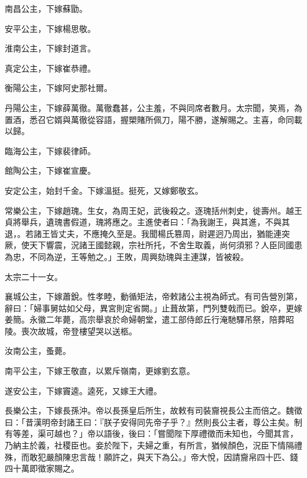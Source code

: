 \begin{pinyinscope}
 南昌公主，下嫁蘇勖。



 安平公主，下嫁楊思敬。



 淮南公主，下嫁封道言。



 真定公主，下嫁崔恭禮。



 衡陽公主，下嫁阿史那社爾。



 丹陽公主，下嫁薛萬徹。萬徹蠢甚，公主羞，不與同席者數月。太宗聞，笑焉，為置酒，悉召它婿與萬徹從容語，握槊賭所佩刀，陽不勝，遂解賜之。主喜，命同載以歸。



 臨海公主，下嫁裴律師。



 館陶公主，下嫁崔宣慶。



 安定公主，始封千金。下嫁溫挺。挺死，又嫁鄭敬玄。



 常樂公主，下嫁趙瑰。生女，為周王妃，武後殺之。逐瑰括州刺史，徙壽州。越王貞將舉兵，遺瑰書假道，瑰將應之。主進使者曰：「為我謝王，與其進，不與其退，。若諸王皆丈夫，不應掩久至是。我聞楊氏篡周，尉遲迥乃周出，猶能連突厥，使天下響震，況諸王國懿親，宗社所托，不舍生取義，尚何須邪？人臣同國患為忠，不同為逆，王等勉之。」王敗，周興劾瑰與主連謀，皆被殺。



 太宗二十一女。



 襄城公主，下嫁蕭銳。性孝睦，動循矩法，帝敕諸公主視為師式。有司告營別第，辭曰：「婦事舅姑如父母，異宮則定省闕。」止葺故第，門列雙戟而已。銳卒，更嫁姜簡。永徽二年薨，高宗舉哀於命婦朝堂，遣工部侍郎丘行淹馳驛吊祭，陪葬昭陵。喪次故城，帝登樓望哭以送柩。



 汝南公主，蚤薨。



 南平公主，下嫁王敬直，以累斥嶺南，更嫁劉玄意。



 遂安公主，下嫁竇逵。逵死，又嫁王大禮。



 長樂公主，下嫁長孫沖。帝以長孫皇后所生，故敕有司裝齎視長公主而倍之。魏徵曰：「昔漢明帝封諸王曰：『朕子安得同先帝子乎？』然則長公主者，尊公主矣。制有等差，渠可越也？」帝以語後，後曰：「嘗聞陛下厚禮徵而未知也，今聞其言，乃納主於義，社稷臣也。妾於陛下，夫婦之重，有所言，猶候顏色，況臣下情隔禮殊，而敢犯嚴顏陳忠言哉！願許之，與天下為公。」帝大悅，因請齎帛四十匹、錢四十萬即徵家賜之。




\end{pinyinscope}
